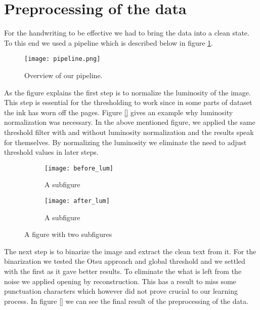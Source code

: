 
\section{Preprocessing of the data}
\label{sec:prepro}
For the handwriting to be effective we had to bring the data into a clean state. To this end we used a pipeline which is described below in figure \ref{fig:pipeline}. 

\begin{figure}[h]
\label{fig:pipeline}
\texttt{[image: pipeline.png]}
\caption{Overview of our pipeline.}
\end{figure}

As the figure explains the first step is to normalize the luminosity of the image. This step is essential for the thresholding to work since in some parts of dataset the ink has worn off the pages. Figure \ref{} gives an example why luminosity normalization was necessary. In the above mentioned figure, we applied the same threshold filter with and without luminosity normalization and the results speak for themselves. By normalizing the luminosity we eliminate the need to adjust threshold values in later steps.

\begin{figure}
\centering
\begin{subfigure}{.3\textwidth}
  \centering
  \texttt{[image: before\_lum]}
  \caption{A subfigure}
  \label{fig:sub1}
\end{subfigure}%
\begin{subfigure}{.3\textwidth}
  \centering
  \texttt{[image: after\_lum]}
  \caption{A subfigure}
  \label{fig:sub2}
\end{subfigure}
\caption{A figure with two subfigures}
\label{fig:test}
\end{figure}

The next step is to binarize the image and extract the clean text from it. For the binarization we tested the Otsu approach and global threshold and we settled with the first as it gave better results. To eliminate the what is left from the noise we applied opening by reconstruction. This has a result to miss some punctuation characters which however did not prove crucial to our learning process. In figure \ref{} we can see the final result of the preprocessing of the data. 
